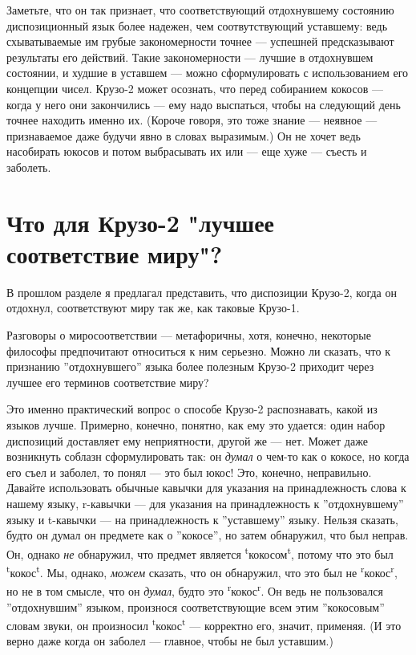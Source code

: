 \documentclass[11pt]{book}
\begin{document}
Заметьте, что он так признает, что соответствующий отдохнувшему состоянию диспозиционный язык более надежен, чем соотвутствующий уставшему: ведь схыватываемые им грубые закономерности точнее --- успешней предсказывают результаты его действий. Такие закономерности --- лучшие в отдохнувшем состоянии, и худшие в уставшем --- можно сформулировать с использованием его концепции чисел. Крузо-2 может осознать, что перед собиранием кокосов --- когда у него они закончились --- ему надо выспаться, чтобы на следующий день точнее находить именно их. (Короче говоря, это тоже знание --- неявное --- признаваемое даже будучи явно в словах выразимым.) Он не хочет ведь насобирать юкосов и потом выбрасывать их или --- еще хуже --- съесть и заболеть.

\section{Что для Крузо-2 "лучшее соответствие миру"?}

В прошлом разделе я предлагал представить, что диспозиции Крузо-2, когда он отдохнул, соответствуют миру так же, как таковые Крузо-1.

Разговоры о миросоответствии --- метафоричны, хотя, конечно, некоторые философы предпочитают относиться к ним серьезно. Можно ли сказать, что к признанию ''отдохнувшего'' языка более полезным Крузо-2 приходит через лучшее его терминов соответствие миру?

Это именно практический вопрос о способе Крузо-2 распознавать, какой из языков лучше. Примерно, конечно, понятно, как ему это удается: один набор диспозиций доставляет ему неприятности, другой же --- нет. Может даже возникнуть соблазн сформулировать так: он \textit{думал} о чем-то как о кокосе, но когда его съел и заболел, то понял --- это был юкос! Это, конечно, неправильно. Давайте использовать обычные кавычки для указания на принадлежность слова к нашему языку, r-кавычки --- для указания на принадлежность к ''отдохнувшему'' языку и t-кавычки --- на принадлежность к ''уставшему'' языку. Нельзя сказать, будто он думал он предмете как о ''кокосе'', но затем обнаружил, что был неправ. Он, однако \textit{не} обнаружил, что предмет является \textsuperscript{t}кокосом\textsuperscript{t}, потому что это был \textsuperscript{t}кокос\textsuperscript{t}. Мы, однако, \textit{можем} сказать, что он обнаружил, что это был не \textsuperscript{r}кокос\textsuperscript{r}, но не в том смысле, что он \textit{думал}, будто это \textsuperscript{r}кокос\textsuperscript{r}. Он ведь не пользовался ''отдохнувшим'' языком, произнося соответствующие всем этим ''кокосовым'' словам звуки, он произносил \textsuperscript{t}кокос\textsuperscript{t} --- корректно его, значит, применяя. (И это верно даже когда он заболел --- главное, чтобы не был уставшим.)
\end{document}
